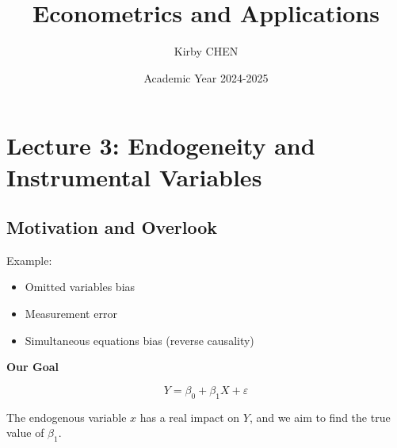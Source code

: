 \documentclass[12pt, oneside]{article}
\title{Econometrics and Applications}
\author{Kirby CHEN}
\date{Academic Year 2024-2025}
\begin{document}
\maketitle
\tableofcontents

\vspace{.25in}

\section{Lecture 3: Endogeneity and Instrumental Variables}

\subsection{Motivation and Overlook}

Example:
\begin{itemize}
    \item Omitted variables bias
    \item Measurement error
    \item Simultaneous equations bias (reverse causality)
\end{itemize}

\textbf{Our Goal}

\[
Y = \beta_0 + \beta_1 X + \varepsilon
\]

The endogenous variable \( x \) has a real impact on \( Y \), and we aim to find the true value of \( \beta_1 \).
\end{document}
